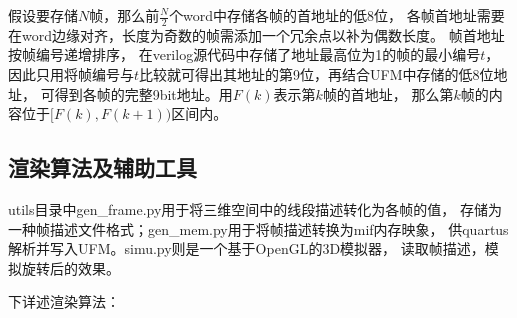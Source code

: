 假设要存储$N$帧，那么前$\frac{N}{2}$个word中存储各帧的首地址的低8位，
各帧首地址需要在word边缘对齐，长度为奇数的帧需添加一个冗余点以补为偶数长度。
帧首地址按帧编号递增排序，
在verilog源代码中存储了地址最高位为1的帧的最小编号$t$，
因此只用将帧编号与$t$比较就可得出其地址的第9位，再结合UFM中存储的低8位地址，
可得到各帧的完整9bit地址。用$F(k)$表示第$k$帧的首地址，
那么第$k$帧的内容位于$[F(k), F(k+1))$区间内。

\subsection{渲染算法及辅助工具}
utils目录中gen\_frame.py用于将三维空间中的线段描述转化为各帧的值，
存储为一种帧描述文件格式；gen\_mem.py用于将帧描述转换为mif内存映象，
供quartus解析并写入UFM。simu.py则是一个基于OpenGL的3D模拟器，
读取帧描述，模拟旋转后的效果。

下详述渲染算法：




